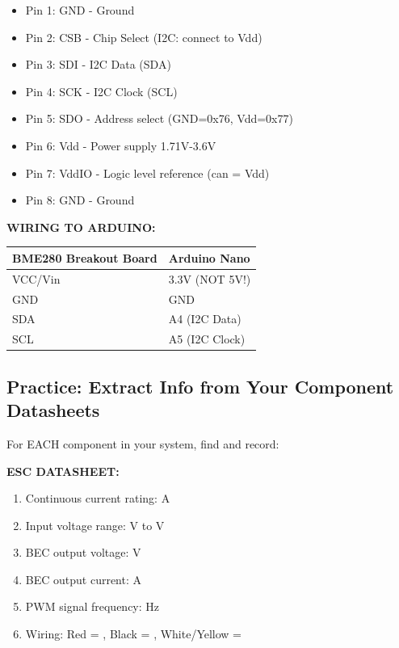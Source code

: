 \documentclass[11pt,letterpaper]{article}
\begin{document}
\begin{tcolorbox}[title=PINOUT (8-pin package)]
\begin{itemize}[nosep]
\item Pin 1: GND - Ground
\item Pin 2: CSB - Chip Select (I2C: connect to Vdd)
\item Pin 3: SDI - I2C Data (SDA)
\item Pin 4: SCK - I2C Clock (SCL)
\item Pin 5: SDO - Address select (GND=0x76, Vdd=0x77)
\item Pin 6: Vdd - Power supply 1.71V-3.6V
\item Pin 7: VddIO - Logic level reference (can = Vdd)
\item Pin 8: GND - Ground
\end{itemize}
\end{tcolorbox}

\textbf{WIRING TO ARDUINO:}

\begin{center}
\begin{tabular}{ll}
\textbf{BME280 Breakout Board} & \textbf{Arduino Nano} \\
\hline
VCC/Vin & 3.3V (NOT 5V!) \\
GND & GND \\
SDA & A4 (I2C Data) \\
SCL & A5 (I2C Clock) \\
\end{tabular}
\end{center}

\subsection{Practice: Extract Info from Your Component Datasheets}

For EACH component in your system, find and record:

\textbf{ESC DATASHEET:}
\begin{enumerate}
\item Continuous current rating: \underline{\hspace{2cm}} A
\item Input voltage range: \underline{\hspace{2cm}} V to \underline{\hspace{2cm}} V
\item BEC output voltage: \underline{\hspace{2cm}} V
\item BEC output current: \underline{\hspace{2cm}} A
\item PWM signal frequency: \underline{\hspace{2cm}} Hz
\item Wiring: Red = \underline{\hspace{2cm}}, Black = \underline{\hspace{2cm}}, White/Yellow = \underline{\hspace{2cm}}
\end{enumerate}
\end{document}
